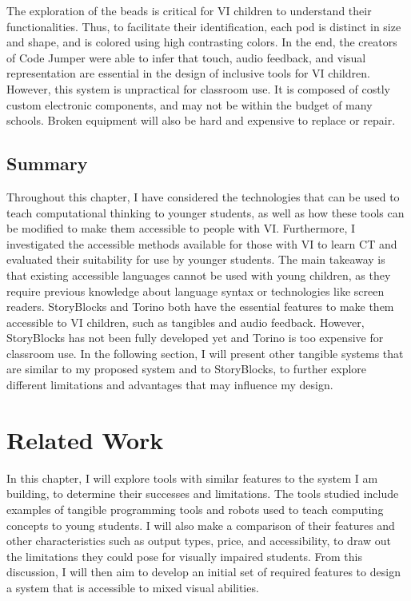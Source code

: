 \documentclass[oneside,%
                    author={Malak Hajji},
                    degree={BSc},
                    title={Designing An Accessible Ozobot Programming Platform for Students},
                  subtitle={With Mixed Visual Abilities}]{dissertation}
\begin{document}
The exploration of the beads is critical for VI children to understand their functionalities. Thus, to facilitate their identification, each pod is distinct in size and shape, and is colored using high contrasting colors. In the end, the creators of Code Jumper were able to infer that touch, audio feedback, and visual representation are essential in the design of inclusive tools for VI children.
However, this system is unpractical for classroom use. It is composed of costly custom electronic components, and may not be within the budget of many schools. Broken equipment will also be hard and expensive to replace or repair. 

\section{Summary}
Throughout this chapter, I have considered the technologies that can be used to teach computational thinking to younger students, as well as how these tools can be modified to make them accessible to people with VI. Furthermore, I investigated the accessible methods available for those with VI to learn CT and evaluated their suitability for use by younger students. The main takeaway is that existing accessible languages cannot be used with young children, as they require previous knowledge about language syntax or technologies like screen readers. StoryBlocks and Torino both have the essential features to make them accessible to VI children, such as tangibles and audio feedback. However, StoryBlocks has not been fully developed yet and Torino is too expensive for classroom use. In the following section, I will present other tangible systems that are similar to my proposed system and to StoryBlocks, to further explore different limitations and advantages that may influence my design.

\chapter{Related Work}
\label{chap:related}
In this chapter, I will explore tools with similar features to the system I am building, to determine their successes and limitations. The tools studied include examples of tangible programming tools and robots used to teach computing concepts to young students. I will also make a comparison of their features and other characteristics such as output types, price, and accessibility, to draw out the limitations they could pose for visually impaired students. From this discussion, I will then aim to develop an initial set of required features to design a system that is accessible to mixed visual abilities.
\end{document}
